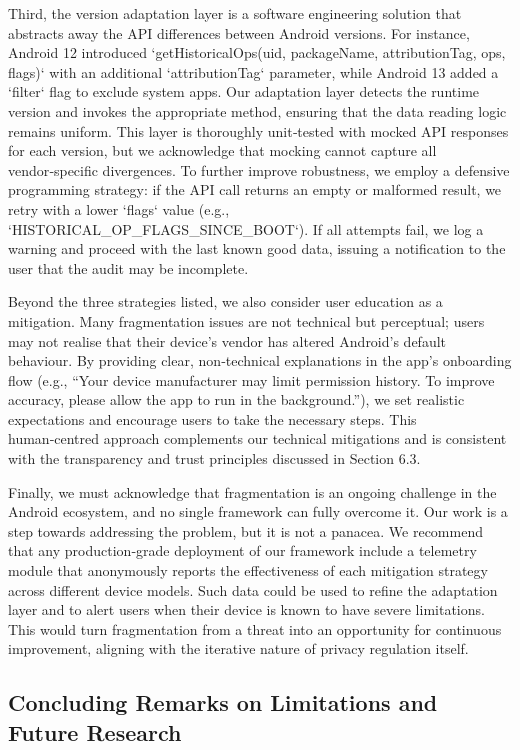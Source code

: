 Third, the version adaptation layer is a software engineering solution that abstracts away the API differences between Android versions. For instance, Android 12 introduced `getHistoricalOps(uid, packageName, attributionTag, ops, flags)` with an additional `attributionTag` parameter, while Android 13 added a `filter` flag to exclude system apps. Our adaptation layer detects the runtime version and invokes the appropriate method, ensuring that the data reading logic remains uniform. This layer is thoroughly unit‑tested with mocked API responses for each version, but we acknowledge that mocking cannot capture all vendor‑specific divergences. To further improve robustness, we employ a defensive programming strategy: if the API call returns an empty or malformed result, we retry with a lower `flags` value (e.g., `HISTORICAL\_OP\_FLAGS\_SINCE\_BOOT`). If all attempts fail, we log a warning and proceed with the last known good data, issuing a notification to the user that the audit may be incomplete.

Beyond the three strategies listed, we also consider user education as a mitigation. Many fragmentation issues are not technical but perceptual; users may not realise that their device's vendor has altered Android's default behaviour. By providing clear, non‑technical explanations in the app's onboarding flow (e.g., ``Your device manufacturer may limit permission history. To improve accuracy, please allow the app to run in the background.''), we set realistic expectations and encourage users to take the necessary steps. This human‑centred approach complements our technical mitigations and is consistent with the transparency and trust principles discussed in Section 6.3.

Finally, we must acknowledge that fragmentation is an ongoing challenge in the Android ecosystem, and no single framework can fully overcome it. Our work is a step towards addressing the problem, but it is not a panacea. We recommend that any production‑grade deployment of our framework include a telemetry module that anonymously reports the effectiveness of each mitigation strategy across different device models. Such data could be used to refine the adaptation layer and to alert users when their device is known to have severe limitations. This would turn fragmentation from a threat into an opportunity for continuous improvement, aligning with the iterative nature of privacy regulation itself.

\subsection*{Concluding Remarks on Limitations and Future Research}

